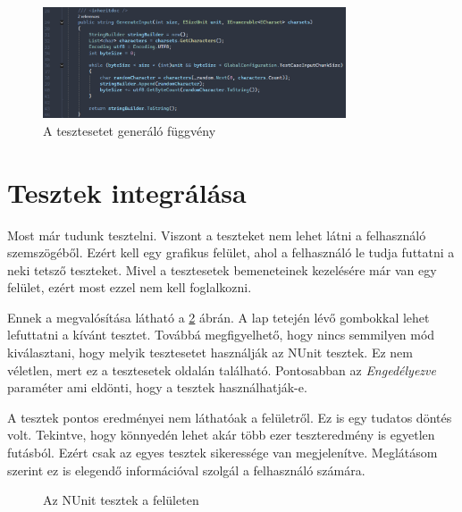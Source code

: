 \documentclass[12pt]{report} %
\begin{document}
\begin{figure}[H]
    \centering %
    \includegraphics[width=0.8\textwidth]{Figures/Implementation7.png} %
    \caption{A tesztesetet generáló függvény} %
    \label{fig:Implementation7} %
\end{figure}

\section{Tesztek integrálása} %

Most már tudunk tesztelni. Viszont a teszteket nem lehet látni a felhasználó szemszögéből. Ezért kell egy grafikus felület, ahol a felhasználó le tudja futtatni a neki tetsző teszteket. Mivel a tesztesetek bemeneteinek kezelésére már van egy felület, ezért most ezzel nem kell foglalkozni.

Ennek a megvalósítása látható a \ref{fig:Implementation8} ábrán. A lap tetején lévő gombokkal lehet lefuttatni a kívánt tesztet. Továbbá megfigyelhető, hogy nincs semmilyen mód kiválasztani, hogy melyik tesztesetet használják az NUnit tesztek. Ez nem véletlen, mert ez a tesztesetek oldalán található. Pontosabban az \textit{Engedélyezve} paraméter ami eldönti, hogy a tesztek használhatják-e.

A tesztek pontos eredményei nem láthatóak a felületről. Ez is egy tudatos döntés volt. Tekintve, hogy könnyedén lehet akár több ezer teszteredmény is egyetlen futásból. Ezért csak az egyes tesztek sikeressége van megjelenítve. Meglátásom szerint ez is elegendő információval szolgál a felhasználó számára.

\begin{figure}[H]
    \centering %
    \caption{Az NUnit tesztek a felületen} %
    \label{fig:Implementation8} %
\end{figure}
\end{document}
